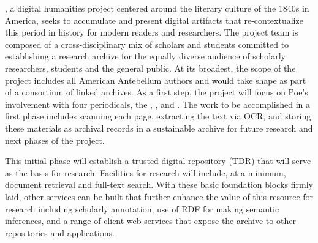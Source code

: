 \message{ !name(draft.tex)}\documentclass{article}
\begin{document}

\projectname, a digital humanities project centered around the literary culture of the 1840s in America, seeks to accumulate and present digital artifacts that re-contextualize this period in history for modern readers and researchers. The project team is composed of a cross-disciplinary mix of scholars and students committed to establishing a research archive for the equally diverse audience of scholarly researchers, students and the general public. At its broadest, the scope of the project includes all American Antebellum authors and would take shape as part of a consortium of linked archives. As a first step, the project will focus on Poe's involvement with four periodicals, the \bwj, \slm, \bgm and \gm. The work to be accomplished in a first phase includes scanning each page, extracting the text via OCR, and storing these materials as archival records in a sustainable archive for future research and next phases of the project. 

This initial phase will establish a trusted digital repository (TDR) that will serve as the basis for research. Facilities for research will include, at a minimum, document retrieval and full-text search. With these basic foundation blocks firmly laid, other services can be built that further enhance the value of this resource for research including scholarly annotation, use of RDF for making semantic inferences, and a range of client web services that expose the archive to other repositories and applications.


\end{document}
